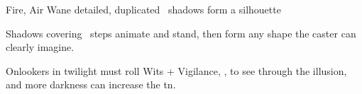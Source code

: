   {Fire, Air}%
  {Wane}%
  {detailed, duplicated}%
  {}%
  {\spellArea\ shadows form a silhouette}%
  {
    Shadows covering \spellArea\ steps animate and stand, then form any shape the caster can clearly imagine.

    \setcounter{track}{\value{spelllevel}}
    \addtocounter{track}{7}
    Onlookers in twilight must roll Wits + Vigilance, , to see through the illusion, and more darkness can increase the \gls{tn}.
  }

